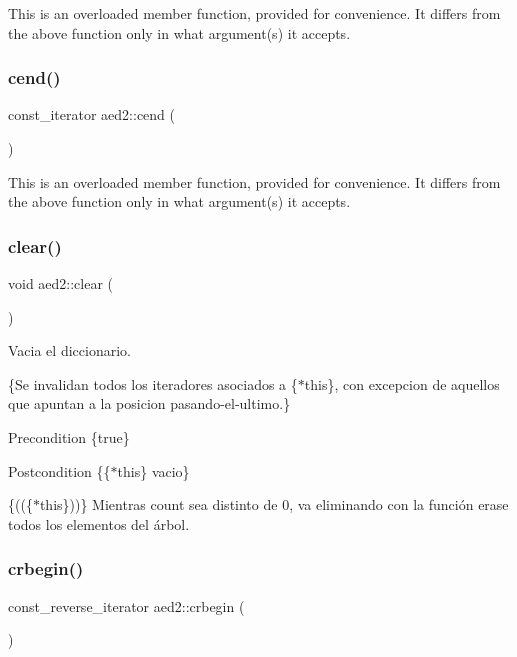 This is an overloaded member function, provided for convenience. It differs from the above function only in what argument(s) it accepts. \mbox{\label{namespaceaed2_a82f5c60a3ebe119105e244fff3c90e20}} 
\subsubsection{\texorpdfstring{cend()}{cend()}}
{\footnotesize\ttfamily const\+\_\+iterator aed2\+::cend (\begin{DoxyParamCaption}{ }\end{DoxyParamCaption})}

This is an overloaded member function, provided for convenience. It differs from the above function only in what argument(s) it accepts. \mbox{\label{namespaceaed2_ac055546b287d4b50772e8b4e9d188ed2}} 
\subsubsection{\texorpdfstring{clear()}{clear()}}
{\footnotesize\ttfamily void aed2\+::clear (\begin{DoxyParamCaption}{ }\end{DoxyParamCaption})}



Vacia el diccionario. 

\{Se invalidan todos los iteradores asociados a \{$\ast$this\}, con excepcion de aquellos que apuntan a la posicion pasando-\/el-\/ultimo.\}

\begin{DoxyPrecond}{Precondition}
\{true\} 
\end{DoxyPrecond}
\begin{DoxyPostcond}{Postcondition}
\{\{$\ast$this\}  vacio\}
\end{DoxyPostcond}
\{((\{$\ast$this\}))\} Mientras count sea distinto de 0, va eliminando con la función erase todos los elementos del árbol. \mbox{\label{namespaceaed2_a38b3285f169e2a78a3b561b5fee6027f}} 
\subsubsection{\texorpdfstring{crbegin()}{crbegin()}}
{\footnotesize\ttfamily const\+\_\+reverse\+\_\+iterator aed2\+::crbegin (\begin{DoxyParamCaption}{ }\end{DoxyParamCaption})}


